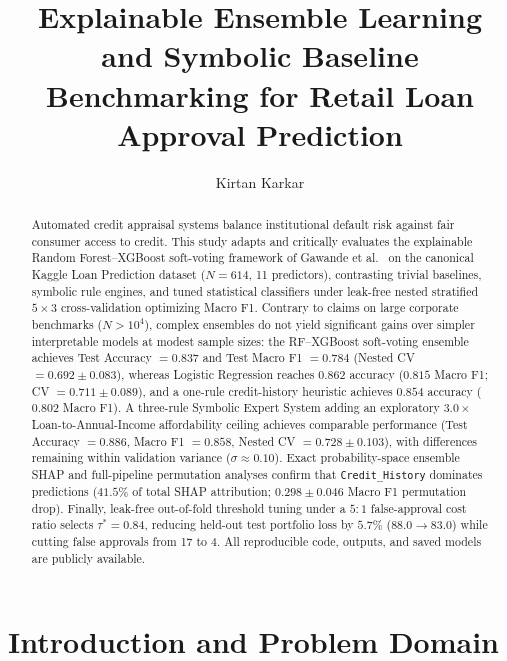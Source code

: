 \documentclass{COMPXXXX}
\begin{document}
\title{Explainable Ensemble Learning and Symbolic Baseline Benchmarking for Retail Loan Approval Prediction}

\author{Kirtan Karkar}

\maketitle


\begin{abstract}
Automated credit appraisal systems balance institutional default risk against fair consumer access to credit. This study adapts and critically evaluates the explainable Random Forest--XGBoost soft-voting framework of Gawande et al.~\cite{gawande2026} on the canonical Kaggle Loan Prediction dataset ($N=614$, 11 predictors), contrasting trivial baselines, symbolic rule engines, and tuned statistical classifiers under leak-free nested stratified $5\times 3$ cross-validation optimizing Macro F1. Contrary to claims on large corporate benchmarks ($N > 10^4$), complex ensembles do not yield significant gains over simpler interpretable models at modest sample sizes: the RF--XGBoost soft-voting ensemble achieves Test Accuracy $=0.837$ and Test Macro F1 $=0.784$ (Nested CV $=0.692 \pm 0.083$), whereas Logistic Regression reaches $0.862$ accuracy ($0.815$ Macro F1; CV $=0.711 \pm 0.089$), and a one-rule credit-history heuristic achieves $0.854$ accuracy ($0.802$ Macro F1). A three-rule Symbolic Expert System adding an exploratory $3.0\times$ Loan-to-Annual-Income affordability ceiling achieves comparable performance (Test Accuracy $=0.886$, Macro F1 $=0.858$, Nested CV $=0.728 \pm 0.103$), with differences remaining within validation variance ($\sigma \approx 0.10$). Exact probability-space ensemble SHAP and full-pipeline permutation analyses confirm that \texttt{Credit\_History} dominates predictions ($41.5\%$ of total SHAP attribution; $0.298 \pm 0.046$ Macro F1 permutation drop). Finally, leak-free out-of-fold threshold tuning under a $5:1$ false-approval cost ratio selects $\tau^*=0.84$, reducing held-out test portfolio loss by $5.7\%$ ($88.0 \to 83.0$) while cutting false approvals from 17 to 4. All reproducible code, outputs, and saved models are publicly available.
\end{abstract}

\section{Introduction and Problem Domain}
\label{sec:intro}
\end{document}
